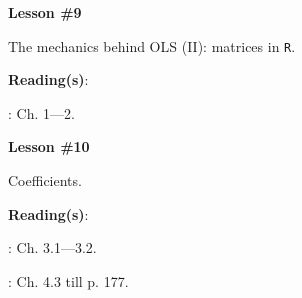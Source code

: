\documentclass[letterpaper]{article}
\renewenvironment{itemize}{
  \begin{list}{}{
    \setlength{\leftmargin}{1.5em}
  }
}{
  \end{list}
}
\begin{document}
\begin{enumerate}

			\begin{itemize} 
				\item[$\bullet$] {\bf Lesson \#9}
					\begin{itemize} 
						\item[$\circ$] The mechanics behind OLS (II): matrices in \texttt{R}.
            \item[$\circ$] {\bf Reading(s)}: 
            \begin{itemize}
              \item[$\diamond$] \textcite{Namboodiri1984}: Ch. 1---2.
            \end{itemize}
					\end{itemize}
			\end{itemize}



			\begin{itemize} 
				\item[$\bullet$] {\bf Lesson \#10}
					\begin{itemize} 
						\item[$\circ$] Coefficients. %
						\item[$\circ$] {\bf Reading(s)}: 
							\begin{itemize}
								\item[$\diamond$] \textcite{Wooldridge2010}: Ch. 3.1---3.2.
                \item[$\diamond$] \textcite{Fox:2010vc}: Ch. 4.3 till p. 177.
							\end{itemize}
					\end{itemize}
			\end{itemize}




\end{enumerate}
\end{document}
